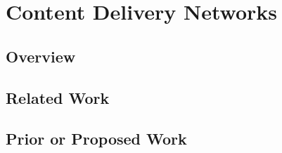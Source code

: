 \section{Content Delivery Networks}
\label{sec:cdn}

\subsection{Overview}


\subsection{Related Work}


\subsection{Prior or Proposed Work}
